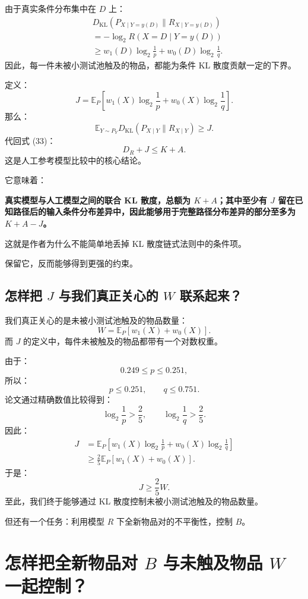 \documentclass[UTF8,11pt]{ctexart}
\begin{document}
由于真实条件分布集中在 $D$ 上：
\[
\begin{aligned}
&D_{\mathrm{KL}}(P_{X\mid Y=y(D)}\|R_{X\mid Y=y(D)})\\
&=-\log_2R(X=D\mid Y=y(D))\\
&\ge w_1(D)\log_2\frac1p+w_0(D)\log_2\frac1q.
\end{aligned}
\]
因此，每一件未被小测试池触及的物品，都能为条件 KL 散度贡献一定的下界。

定义：
\begin{equation}
\boxed{J=\mathbb E_P\left[w_1(X)\log_2\frac1p+w_0(X)\log_2\frac1q\right].}
\tag{37}
\end{equation}
那么：
\[\mathbb E_{Y\sim P_Y}D_{\mathrm{KL}}(P_{X\mid Y}\|R_{X\mid Y})\ge J.\]
代回式 (33)：
\begin{equation}\boxed{D_R+J\le K+A.}\tag{38}\end{equation}
这是人工参考模型比较中的核心结论。

它意味着：

\textbf{真实模型与人工模型之间的联合 KL 散度，总额为 $K+A$；其中至少有 $J$ 留在已知路径后的输入条件分布差异中，因此能够用于完整路径分布差异的部分至多为 $K+A-J$。}

这就是作者为什么不能简单地丢掉 KL 散度链式法则中的条件项。

保留它，反而能够得到更强的约束。

\subsection{怎样把 $J$ 与我们真正关心的 $W$ 联系起来？}
我们真正关心的是未被小测试池触及的物品数量：
\[W=\mathbb E_P[w_1(X)+w_0(X)].\]
而 $J$ 的定义中，每件未被触及的物品都带有一个对数权重。

由于：
\[0.249\le p\le0.251,\]
所以：
\[p\le0.251,\qquad q\le0.751.\]
论文通过精确数值比较得到：
\[\log_2\frac1p>\frac25,\qquad\log_2\frac1q>\frac25.\]
因此：
\[
\begin{aligned}
J&=\mathbb E_P\left[w_1(X)\log_2\frac1p+w_0(X)\log_2\frac1q\right]\\
&\ge\frac25\mathbb E_P[w_1(X)+w_0(X)].
\end{aligned}
\]
于是：
\begin{equation}\boxed{J\ge\frac25W.}\tag{39}\end{equation}
至此，我们终于能够通过 KL 散度控制未被小测试池触及的物品数量。

但还有一个任务：利用模型 $R$ 下全新物品对的不平衡性，控制 $B$。

\section{怎样把全新物品对 $B$ 与未触及物品 $W$ 一起控制？}
\end{document}
